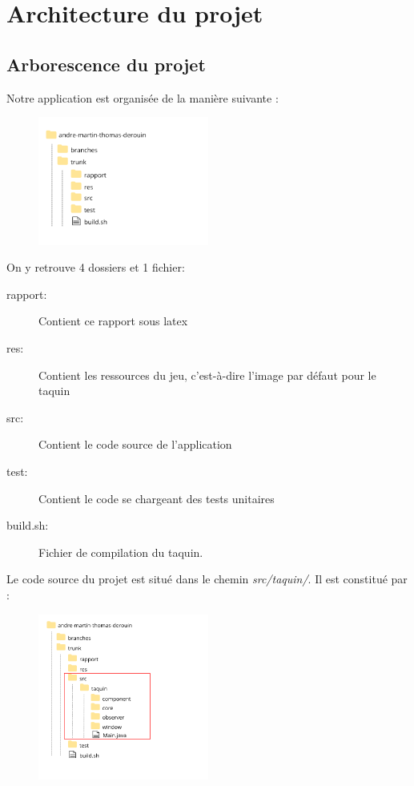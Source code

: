 \chapter{Architecture du projet}

	\section{Arborescence du projet}

		Notre application est organisée de la manière suivante :


		\begin{figure}[H]
			\centering
			\includegraphics[width=0.5\textwidth, keepaspectratio]{img/racine.png}
		\end{figure}

		On y retrouve 4 dossiers et 1 fichier:

		\begin{description}
			\item [rapport:] Contient ce rapport sous latex
			\item [res:] Contient les ressources du jeu, c'est-à-dire l’image par défaut pour le taquin
			\item [src:] Contient le code source de l’application
			\item [test:] Contient le code se chargeant des tests unitaires
			\item [build.sh:] Fichier de compilation du taquin.
		\end{description}

		Le code source du projet est situé dans le chemin \textit{src/taquin/}. Il est constitué par :

		\begin{figure}[H]
			\centering
			\includegraphics[width=0.5\textwidth, keepaspectratio]{img/detail.png}
		\end{figure}

